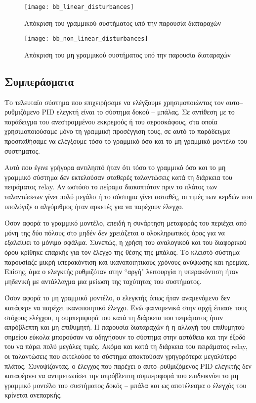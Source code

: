 \begin{figure}[h]
  \centering
  \texttt{[image: bb\_linear\_disturbances]}
  \caption{Απόκριση του γραμμικού συστήματος υπό την παρουσία διαταραχών}
  \label{fig:bb_linear_disturbances}
\end{figure}

\begin{figure}[h]
  \centering
  \texttt{[image: bb\_non\_linear\_disturbances]}
  \caption{Απόκριση του μη γραμμικού συστήματος υπό την παρουσία διαταραχών}
  \label{fig:bb_non_linear_disturbances}
\end{figure}

\subsection{Συμπεράσματα}

Το τελευταίο σύστημα που επιχειρήσαμε να ελέγξουμε χρησιμοποιώντας τον αυτο--ρυθμιζόμενο PID ελεγκτή είναι το σύστημα δοκού -- μπάλας. Σε αντίθεση με το παράδειγμα του ανεστραμμένου εκκρεμούς ή του αεροσκάφους, στα οποία χρησιμοποιούσαμε μόνο τη γραμμική προσέγγιση τους, σε αυτό το παράδειγμα προσπαθήσαμε να ελέγξουμε τόσο το γραμμικό όσο και το μη γραμμικό μοντέλο του συστήματος.

Αυτό που έγινε γρήγορα αντιληπτό ήταν ότι τόσο το γραμμικό όσο και το μη γραμμικό σύστημα δεν εκτελούσαν σταθερές ταλαντώσεις κατά τη διάρκεια του πειράματος relay. Αν ωστόσο το πείραμα διακοπτόταν πριν το πλάτος των ταλαντώσεων γίνει πολύ μεγάλο ή το σύστημα γίνει ασταθές, οι τιμές των κερδών που υπολόγιζε ο αλγόριθμος ήταν αρκετές για να παρέχουν έλεγχο.

Όσον αφορά το γραμμικό μοντέλο, επειδή η συνάρτηση μεταφοράς του περιέχει από μόνη της δύο πόλους στο μηδέν δεν χρειάζεται ο ολοκληρωτικός όρος για να εξαλείψει το μόνιμο σφάλμα. Συνεπώς, η χρήση του αναλογικού και του διαφορικού όρου κρίθηκε επαρκής για τον έλεγχο της θέσης της μπάλας. Το κλειστό σύστημα παρουσίαζε μικρή υπερακόντιση και ικανοποιητικούς χρόνους ανύψωσης και ηρεμίας. Επίσης, άμα ο ελεγκτής ρυθμιζόταν στην ``αργή" λειτουργία η υπερακόντιση ήταν μηδενική με αντάλλαγμα μια μείωση της ταχύτητας του συστήματος.

Όσον αφορά το μη γραμμικό μοντέλο, ο ελεγκτής όπως ήταν αναμενόμενο δεν κατάφερε να παρέχει ικανοποιητικό έλεγχο. Ενώ φαινομενικά στην αρχή έπιασε τους στόχους ελέγχου, η συμπεριφορά του κατά τη διάρκεια του πειράματος ήταν απρόβλεπτη και μη επιθυμητή. Η παρουσία διαταραχών ή η αλλαγή του επιθυμητού σημείου εύκολα μπορούσαν να οδηγήσουν το σύστημα στην αστάθεια και την έξοδό του να πάρει πολύ μεγάλες τιμές. Ακόμα και κατά τη διάρκεια του πειράματος relay, οι ταλαντώσεις που εκτελούσε το σύστημα αποκτούσαν γρηγορότερα μεγαλύτερο πλάτος. Συνοψίζοντας, ο έλεγχος που παρέχει ο αυτο--ρυθμιζόμενος PID ελεγκτής δεν καταφέρνει να αντιμετωπίσει την απρόβλεπτη συμπεριφορά που επιδεικνύει το μη γραμμικό μοντέλο του συστήματος δοκός -- μπάλα και ως αποτέλεσμα ο έλεγχός του κρίνεται ανεπαρκής. 

